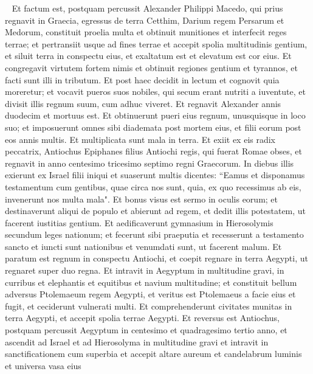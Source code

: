 
\begin{biblechapter}   
\verse Et factum est, postquam percussit Alexander Philippi Macedo, qui prius regnavit in Graecia, egressus de terra Cetthim, Darium regem Persarum et Medorum, 
\verse constituit proelia multa et obtinuit munitiones et interfecit reges terrae; 
\verse et pertransiit usque ad fines terrae et accepit spolia multitudinis gentium, et siluit terra in conspectu eius, et exaltatum est et elevatum est cor eius. 
\verse Et congregavit virtutem fortem nimis et obtinuit regiones gentium et tyrannos, et facti sunt illi in tributum. 
\verse Et post haec decidit in lectum et cognovit quia moreretur; 
\verse et vocavit pueros suos nobiles, qui secum erant nutriti a iuventute, et divisit illis regnum suum, cum adhuc viveret. 
\verse Et regnavit Alexander annis duodecim et mortuus est. 
\verse Et obtinuerunt pueri eius regnum, unusquisque in loco suo; 
\verse et imposuerunt omnes sibi diademata post mortem eius, et filii eorum post eos annis multis. Et multiplicata sunt mala in terra. 
\verse Et exiit ex eis radix peccatrix, Antiochus Epiphanes filius Antiochi regis, qui fuerat Romae obses, et regnavit in anno centesimo tricesimo septimo regni Graecorum. 
\verse In diebus illis exierunt ex Israel filii iniqui et suaserunt multis dicentes: “Eamus et disponamus testamentum cum gentibus, quae circa nos sunt, quia, ex quo recessimus ab eis, invenerunt nos multa mala". 
\verse Et bonus visus est sermo in oculis eorum; 
\verse et destinaverunt aliqui de populo et abierunt ad regem, et dedit illis potestatem, ut facerent iustitias gentium.  
\verse Et aedificaverunt gymnasium in Hierosolymis secundum leges nationum; 
\verse et fecerunt sibi praeputia et recesserunt a testamento sancto et iuncti sunt nationibus et venumdati sunt, ut facerent malum. 
\verse Et paratum est regnum in conspectu Antiochi, et coepit regnare in terra Aegypti, ut regnaret super duo regna. 
\verse Et intravit in Aegyptum in multitudine gravi, in curribus et elephantis et equitibus et navium multitudine;  
\verse et constituit bellum adversus Ptolemaeum regem Aegypti, et veritus est Ptolemaeus a facie eius et fugit, et ceciderunt vulnerati multi. 
\verse Et comprehenderunt civitates munitas in terra Aegypti, et accepit spolia terrae Aegypti. 
\verse Et reversus est Antiochus, postquam percussit Aegyptum in centesimo et quadragesimo tertio anno, et ascendit ad Israel et ad Hierosolyma in multitudine gravi 
\verse et intravit in sanctificationem cum superbia et accepit altare aureum et candelabrum luminis et universa vasa eius 

\end{biblechapter}
